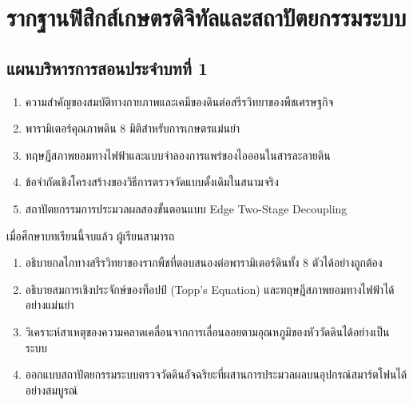 \chapter{รากฐานฟิสิกส์เกษตรดิจิทัลและสถาปัตยกรรมระบบ}
\label{chap:ch01}

\section*{แผนบริหารการสอนประจำบทที่ 1}

\begin{tcolorbox}[
    enhanced, breakable,
    colback=white, colframe=rbruNavy,
    fonttitle=\bfseries\color{white},
    title={1. หัวข้อเนื้อหาประจำบท},
    arc=1.5mm, boxrule=0.8pt, leftrule=3.5mm
]
\begin{enumerate}
    \item ความสำคัญของสมบัติทางกายภาพและเคมีของดินต่อสรีรวิทยาของพืชเศรษฐกิจ
    \item พารามิเตอร์คุณภาพดิน 8 มิติสำหรับการเกษตรแม่นยำ
    \item ทฤษฎีสภาพยอมทางไฟฟ้าและแบบจำลองการแพร่ของไอออนในสารละลายดิน
    \item ข้อจำกัดเชิงโครงสร้างของวิธีการตรวจวัดแบบดั้งเดิมในสนามจริง
    \item สถาปัตยกรรมการประมวลผลสองขั้นตอนแบบ Edge Two-Stage Decoupling
\end{enumerate}
\end{tcolorbox}

\begin{tcolorbox}[
    enhanced, breakable,
    colback=white, colframe=rbruNavy,
    fonttitle=\bfseries\color{white},
    title={2. วัตถุประสงค์เชิงพฤติกรรม},
    arc=1.5mm, boxrule=0.8pt, leftrule=3.5mm
]
เมื่อศึกษาบทเรียนนี้จบแล้ว ผู้เรียนสามารถ
\begin{enumerate}
    \item อธิบายกลไกทางสรีรวิทยาของรากพืชที่ตอบสนองต่อพารามิเตอร์ดินทั้ง 8 ตัวได้อย่างถูกต้อง
    \item อธิบายสมการเชิงประจักษ์ของท็อปป์ (Topp's Equation) และทฤษฎีสภาพยอมทางไฟฟ้าได้อย่างแม่นยำ
    \item วิเคราะห์สาเหตุของความคลาดเคลื่อนจากการเลื่อนลอยตามอุณหภูมิของหัววัดดินได้อย่างเป็นระบบ
    \item ออกแบบสถาปัตยกรรมระบบตรวจวัดดินอัจฉริยะที่ผสานการประมวลผลบนอุปกรณ์สมาร์ตโฟนได้อย่างสมบูรณ์
\end{enumerate}
\end{tcolorbox}

